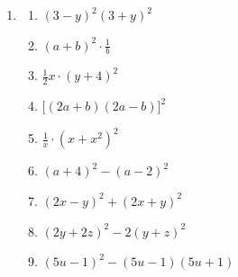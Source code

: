 \begin{ueb}
\begin{enumerate}
        \item
              \begin{enumerate}
                  \item \((3-y)^2(3+y)^2\)
                  \item \((a+b)^2\cdot\frac{1}{b}\)
                  \item \(\frac{1}{2}x\cdot(y+4)^2\)
                  \item \(\bigl[(2a+b)(2a-b)\bigr]^2\)
                  \item \(\frac{1}{x}\cdot(x+x^2)^2\)
                  \item \((a+4)^2-(a-2)^2\)
                  \item \((2x-y)^2+(2x+y)^2\)
                  \item \((2y+2z)^2-2(y+z)^2\)
                  \item \((5u-1)^2-(5u-1)(5u+1)\)
              \end{enumerate}
    \end{enumerate}
\end{ueb}


